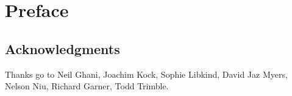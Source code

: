 \documentclass[Book-Poly]{subfiles}
\begin{document}
%


\setcounter{chapter}{-1}%


\chapter*{Preface}\label{chapter.0}


\section*{Acknowledgments}

Thanks go to Neil Ghani, Joachim Kock, Sophie Libkind, David Jaz Myers, Nelson Niu, Richard Garner, Todd Trimble.
\end{document}
